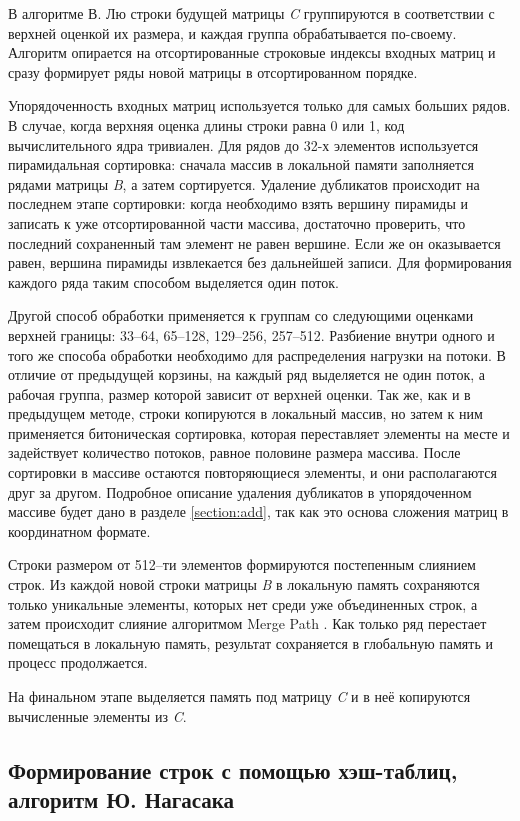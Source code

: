 \documentclass[14pt]{extarticle}
\newcommand{\txt}{\textit}
\begin{document}
	В алгоритме В. Лю \cite{liu} строки будущей матрицы \txt{C} группируются в соответствии с верхней оценкой их размера, и каждая группа обрабатывается по-своему. Алгоритм опирается на отсортированные строковые индексы входных матриц и сразу формирует ряды новой матрицы в отсортированном порядке. 
	
	Упорядоченность входных матриц используется только для самых больших рядов. В случае, когда верхняя оценка длины строки равна 0 или 1, код вычислительного ядра тривиален. Для рядов до 32-х элементов используется пирамидальная сортировка: сначала массив в локальной памяти заполняется рядами матрицы \txt{B}, а затем сортируется. Удаление дубликатов происходит на последнем этапе сортировки: когда необходимо взять вершину пирамиды и записать к уже отсортированной части массива, достаточно проверить, что последний сохраненный там элемент не равен вершине. Если же он оказывается равен, вершина пирамиды извлекается без дальнейшей записи. Для формирования каждого ряда таким способом выделяется один поток.  
	
	Другой способ обработки применяется к группам со следующими оценками верхней границы: 33--64, 65--128, 129--256, 257--512. Разбиение внутри одного и того же способа обработки необходимо для распределения нагрузки на потоки. В отличие от предыдущей корзины, на каждый ряд выделяется не один поток, а рабочая группа, размер которой зависит от верхней оценки. Так же, как и в предыдущем методе, строки копируются в локальный массив, но затем к ним применяется битоническая сортировка, которая переставляет элементы на месте и задействует количество потоков, равное половине размера массива. После сортировки в массиве остаются повторяющиеся элементы, и они располагаются друг за другом. Подробное описание удаления дубликатов в упорядоченном массиве будет дано в разделе \ref{section:add}, так как это основа сложения матриц в координатном формате. 
	
	Строки размером от 512--ти элементов формируются постепенным слиянием строк. Из каждой новой строки матрицы \txt{B} в локальную память сохраняются только уникальные элементы, которых нет среди уже объединенных строк, а затем происходит слияние алгоритмом Merge Path \cite{green}. Как только ряд перестает помещаться в локальную память, результат сохраняется в глобальную память и процесс продолжается. 
	
	На финальном этапе выделяется память под матрицу \txt{C} и в неё копируются вычисленные элементы из \~{\txt{C}}.
	
	
	\subsection*{Формирование строк с помощью хэш-таблиц, алгоритм Ю. Нагасака}
	
\end{document}
